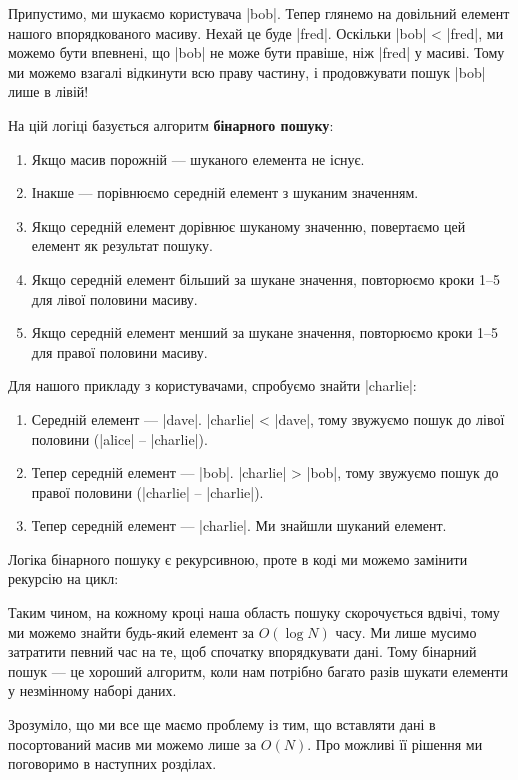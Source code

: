 \documentclass[12pt,a4paper]{report}
\begin{document}
Припустимо, ми шукаємо користувача |bob|. Тепер глянемо на довільний елемент нашого впорядкованого масиву. Нехай це буде |fred|. Оскільки |bob| < |fred|, ми можемо бути впевнені, що |bob| не може бути правіше, ніж |fred| у масиві. Тому ми можемо взагалі відкинути всю праву частину, і продовжувати пошук |bob| лише в лівій!

На цій логіці базується алгоритм \textbf{бінарного пошуку}:
\begin{enumerate}
    \item Якщо масив порожній --- шуканого елемента не існує.
    \item Інакше --- порівнюємо середній елемент з шуканим значенням.
    \item Якщо середній елемент дорівнює шуканому значенню, повертаємо цей елемент як результат пошуку.
    \item Якщо середній елемент більший за шукане значення, повторюємо кроки 1--5 для лівої половини масиву.
    \item Якщо середній елемент менший за шукане значення, повторюємо кроки 1--5 для правої половини масиву.
\end{enumerate}

Для нашого прикладу з користувачами, спробуємо знайти |charlie|:
\begin{enumerate}
    \item Середній елемент --- |dave|. |charlie| < |dave|, тому звужуємо пошук до лівої половини (|alice| -- |charlie|).
    \item Тепер середній елемент --- |bob|. |charlie| > |bob|, тому звужуємо пошук до правої половини (|charlie| -- |charlie|).
    \item Тепер середній елемент --- |charlie|. Ми знайшли шуканий елемент.
\end{enumerate}

Логіка бінарного пошуку є рекурсивною, проте в коді ми можемо замінити рекурсію на цикл:



Таким чином, на кожному кроці наша область пошуку скорочується вдвічі, тому ми можемо знайти будь-який елемент за \(O(\log N)\) часу. Ми лише мусимо затратити певний час на те, щоб спочатку впорядкувати дані. Тому бінарний пошук --- це хороший алгоритм, коли нам потрібно багато разів шукати елементи у незмінному наборі даних.

Зрозуміло, що ми все ще маємо проблему із тим, що вставляти дані в посортований масив ми можемо лише за \(O(N)\). Про можливі її рішення ми поговоримо в наступних розділах.
\end{document}
